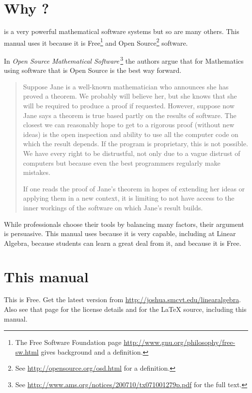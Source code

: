 \section{Why \Sage?}
\Sage{} is a very powerful mathematical software systems but so are
many others.
This manual uses it because it is 
Free\footnote{The Free Software Foundation page 
\protect\url{http://www.gnu.org/philosophy/free-sw.html} 
gives background and a definition.} 
and Open Source\footnote{See \protect\url{http://opensource.org/osd.html} 
for a definition.} 
software.

In 
\textit{Open Source Mathematical Software\,}\citep{JoynerStein07}\footnote{See 
\protect\url{http://www.ams.org/notices/200710/tx071001279p.pdf} for the 
full text.}
the authors argue that for Mathematics using software that is Open Source
is the best way forward.

\begin{quotation}\small
Suppose Jane is a well-known mathematician who announces
she has proved a theorem. We probably will believe
her, but she knows that she will be required to produce
a proof if requested. However, suppose now Jane says a
theorem is true based partly on the results of software. The
closest we can reasonably hope to get to a rigorous proof
(without new ideas) is the open inspection and ability to use
all the computer code on which the result depends. If the
program is proprietary, this is not possible. We have every
right to be distrustful, not only due to a vague distrust of
computers but because even the best programmers regularly
make mistakes.

If one reads the proof of Jane’s theorem in hopes of
extending her ideas or applying them in a new context, it
is limiting to not have access to the inner workings of the
software on which Jane’s result builds.
\end{quotation}  
While professionals choose their tools by balancing many factors,
their argument is persuasive.
This manual uses \Sage{} because it is very capable, 
including at Linear Algebra, because students can 
learn a great deal from it,
and because it is Free.


\section{This manual}
This is Free.
Get the latest version from 
\url{http://joshua.smcvt.edu/linearalgebra}.
Also see that page for the license details and for 
the \LaTeX{} source, including this manual.

